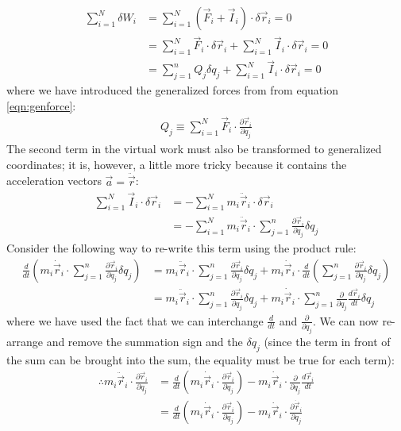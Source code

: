 \begin{align}
\sum_{i=1}^N\delta W_i&= \sum_{i=1}^N (\vec{F}_i+\vec{I}_i)\cdot\delta\vec{r}_i=0\nonumber\\
&=\sum_{i=1}^N \vec{F}_i\cdot\delta\vec{r}_i+\sum_{i=1}^N \vec{I}_i\cdot\delta\vec{r}_i=0\nonumber\\
&=\sum_{j=1}^nQ_j\delta q_j+\sum_{i=1}^N \vec{I}_i\cdot\delta\vec{r}_i=0
\end{align}
where we have introduced the generalized forces from from equation \ref{eqn:genforce}:
\begin{align}
Q_j\equiv \sum_{i=1}^N\vec{F}_i\cdot\frac{\partial\vec{r}_i}{\partial q_j}
\end{align}
The second term in the virtual work must also be transformed to generalized coordinates; it is, however, a little more tricky because it contains the acceleration vectors $\vec{a}=\ddot{\vec{r}}$:
\begin{align}
\sum_{i=1}^N \vec{I}_i\cdot\delta\vec{r}_i&=-\sum_{i=1}^N m_i\ddot{\vec{r}}_i\cdot\delta\vec{r}_i\nonumber\\
&=-\sum_{i=1}^N m_i\ddot{\vec{r}}_i\cdot\sum_{j=1}^n\frac{\partial\vec{r}_i}{\partial q_j}\delta q_j
\label{eqn:dalemb2}
\end{align}
Consider the following way to re-write this term using the product rule:
\begin{align}
\frac{d}{dt}\left(m_i\dot{\vec{r}}_i\cdot\sum_{j=1}^n\frac{\partial\vec{r}_i}{\partial q_j}\delta q_j \right)&=m_i\ddot{\vec{r}}_i\cdot\sum_{j=1}^n\frac{\partial\vec{r}_i}{\partial q_j}\delta q_j + m_i\dot{\vec{r}}_i\cdot\frac{d}{dt}\left(\sum_{j=1}^n\frac{\partial\vec{r}_i}{\partial q_j}\delta q_j \right)\nonumber\\
&=m_i\ddot{\vec{r}}_i\cdot\sum_{j=1}^n\frac{\partial\vec{r}_i}{\partial q_j}\delta q_j + m_i\dot{\vec{r}}_i\cdot\sum_{j=1}^n\frac{\partial}{\partial q_j}\frac{d\vec{r}_i}{dt}\delta q_j \nonumber
\end{align}
where we have used the fact that we can interchange $\frac{d}{dt}$ and $\frac{\partial}{\partial q_j}$. We can now re-arrange and remove the summation sign and the $\delta q_j$ (since the term in front of the sum can be brought into the sum, the equality must be true for each term):
\begin{align}
\therefore m_i\ddot{\vec{r}}_i\cdot\frac{\partial\vec{r}_i}{\partial q_j} &= \frac{d}{dt}\left(m_i\dot{\vec{r}}_i\cdot\frac{\partial\vec{r}_i}{\partial q_j} \right) - m_i\dot{\vec{r}}_i\cdot\frac{\partial}{\partial q_j}\frac{d\vec{r}_i}{dt}\nonumber\\
&=\frac{d}{dt}\left(m_i\dot{\vec{r}}_i\cdot\frac{\partial\vec{r}_i}{\partial q_j} \right) - m_i\dot{\vec{r}}_i\cdot\frac{\partial\dot{\vec{r}}_i}{\partial q_j}
\label{eqn:expand}
\end{align}
